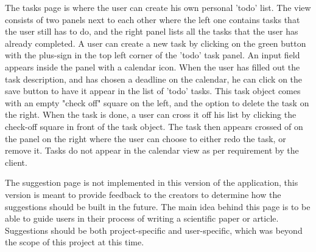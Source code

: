 The tasks page is where the user can create his own personal 'todo' list. The view consists of two
panels next to each other where the left one contains tasks that the user still has to do,
and the right panel lists all the tasks that the user has already completed. A user can create
a new task by clicking on the green button with the plus-sign in the top left corner of the 'todo' task
panel. An input field appears inside the panel with a calendar icon. When the user has filled out
the task description, and has chosen a deadline on the calendar, he can click on the save button to have
it appear in the list of 'todo' tasks. This task object comes with an empty "check off" square on the left,
and the option to delete the task on the right. When the task is done, a user can cross it off his list by
clicking the check-off square in front of the task object. The task then appears crossed of on the panel on
the right where the user can choose to either redo the task, or remove it. Tasks do not appear in the calendar
view as per requirement by the client.


The suggestion page is not implemented in this version of the application, this version is meant to provide feedback to the creators
to determine how the suggestions should be built in the future. The main idea behind this page is to be able to guide users in their
process of writing a scientific paper or article. Suggestions should be both project-specific and user-specific, which was beyond
the scope of this project at this time.